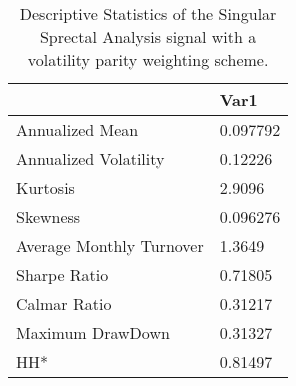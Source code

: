 \begin{table}[H]
\centering
\begin{tabular}{ll}
& Var1 \\ 
\hline 
Annualized Mean & 0.097792 \\ 
Annualized Volatility & 0.12226 \\ 
Kurtosis & 2.9096 \\ 
Skewness & 0.096276 \\ 
Average Monthly Turnover & 1.3649 \\ 
Sharpe Ratio & 0.71805 \\ 
Calmar Ratio & 0.31217 \\ 
Maximum DrawDown & 0.31327 \\ 
HH* & 0.81497 \\ 
\hline
\end{tabular}
\caption{Descriptive Statistics of the Singular Sprectal Analysis signal with a volatility parity weighting scheme.}
\label{SSA_IndQuantity}
\end{table}